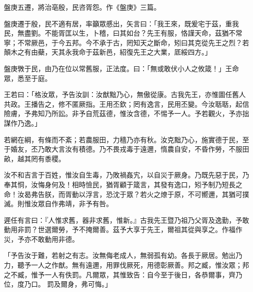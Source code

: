 
\begin{pinyinscope}
盤庚五遷，將治亳殷，民咨胥怨。作《盤庚》三篇。

盤庚遷于殷，民不適有居，率籲眾慼出，矢言曰：「我王來，既爰宅于茲，重我民，無盡劉。不能胥匡以生，卜稽，曰其如台？先王有服，恪謹天命，茲猶不常寧；不常厥邑，于今五邦。今不承于古，罔知天之斷命，矧曰其克從先王之烈？若顛木之有由蘗，天其永我命于茲新邑，紹復先王之大業，厎綏四方。」

盤庚斆于民，由乃在位以常舊服，正法度。曰：「無或敢伏小人之攸箴！」王命眾，悉至于庭。

王若曰：「格汝眾，予告汝訓：汝猷黜乃心，無傲從康。古我先王，亦惟圖任舊人共政。王播告之，修不匿厥指。王用丕欽；罔有逸言，民用丕變。今汝聒聒，起信險膚，予弗知乃所訟。非予自荒茲德，惟汝含德，不惕予一人。予若觀火，予亦拙謀作乃逸。」

若網在綱，有條而不紊；若農服田，力穡乃亦有秋。汝克黜乃心，施實德于民，至于婚友，丕乃敢大言汝有積德。乃不畏戎毒于遠邇，惰農自安，不昏作勞，不服田畝，越其罔有黍稷。

汝不和吉言于百姓，惟汝自生毒，乃敗禍姦宄，以自災于厥身。乃既先惡于民，乃奉其恫，汝悔身何及！相時憸民，猶胥顧于箴言，其發有逸口，矧予制乃短長之命！汝曷弗告朕，而胥動以浮言，恐沈于眾？若火之燎于原，不可嚮邇，其猶可撲滅。則惟汝眾自作弗靖，非予有咎。

遲任有言曰：『人惟求舊，器非求舊，惟新。』古我先王暨乃祖乃父胥及逸勤，予敢動用非罰？世選爾勞，予不掩爾善。茲予大享于先王，爾祖其從與享之。作福作災，予亦不敢動用非德。

「予告汝于難，若射之有志。汝無侮老成人，無弱孤有幼。各長于厥居。勉出乃力，聽予一人之作猷。無有遠邇，用罪伐厥死，用德彰厥善。邦之臧，惟汝眾；邦之不臧，惟予一人有佚罰。凡爾眾，其惟致告：自今至于後日，各恭爾事，齊乃位，度乃口。 罰及爾身，弗可悔。」


\end{pinyinscope}